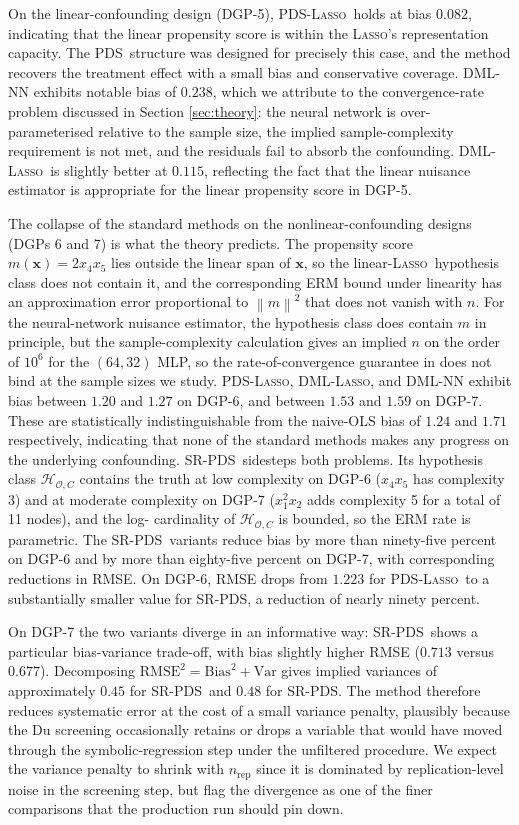 \documentclass[11pt, a4paper]{article}
\theoremstyle{plain}
\theoremstyle{definition}
\theoremstyle{remark}
\newcommand{\lasso}{\textsc{Lasso}}
\newcommand{\pds}{\textsc{PDS}}
\newcommand{\dml}{\textsc{DML}}
\newcommand{\epds}{\textsc{SR-PDS}}
\newcommand{\norm}[1]{\left\lVert #1 \right\rVert}
\newcommand{\Hcal}{\mathcal{H}_{\mathcal{O}, C}}
\begin{document}
On the linear-confounding design (DGP-5), \pds-\lasso\ holds at
bias $0.082$, indicating that the linear propensity score is
within the \lasso's representation capacity. The \pds\ structure
was designed for precisely this case, and the method recovers
the treatment effect with a small bias and conservative coverage.
\dml-NN exhibits notable bias of $0.238$, which we attribute to
the convergence-rate problem discussed in Section
\ref{sec:theory}: the neural network is over-parameterised
relative to the sample size, the implied sample-complexity
requirement is not met, and the residuals fail to absorb the
confounding. \dml-\lasso\ is slightly better at $0.115$,
reflecting the fact that the linear nuisance estimator is
appropriate for the linear propensity score in DGP-5.

The collapse of the standard methods on the nonlinear-confounding
designs (DGPs 6 and 7) is what the theory predicts. The
propensity score $m(\bm{x}) = 2 x_4 x_5$ lies outside the linear
span of $\bm{x}$, so the linear-\lasso\ hypothesis class does
not contain it, and the corresponding ERM bound under linearity
has an approximation error proportional to $\norm{m}^2$ that does
not vanish with $n$. For the neural-network nuisance estimator,
the hypothesis class does contain $m$ in principle, but the
sample-complexity calculation gives an implied $n$ on the order
of $10^6$ for the $(64, 32)$ MLP, so the rate-of-convergence
guarantee in \citet{chernozhukov2018} does not bind at the
sample sizes we study. \pds-\lasso, \dml-\lasso, and \dml-NN
exhibit bias between $1.20$ and $1.27$ on DGP-6, and between
$1.53$ and $1.59$ on DGP-7. These are statistically
indistinguishable from the naive-OLS bias of $1.24$ and $1.71$
respectively, indicating that none of the standard methods makes
any progress on the underlying confounding. \epds\ sidesteps both problems. Its hypothesis class $\Hcal$
contains the truth at low complexity on DGP-6 ($x_4 x_5$ has
complexity 3) and at moderate complexity on DGP-7 ($x_1^2 x_2$
adds complexity 5 for a total of 11 nodes), and the log-%
cardinality of $\Hcal$ is bounded, so the ERM rate is parametric. The \epds\ variants
reduce bias by more than ninety-five percent on DGP-6 and by
more than eighty-five percent on DGP-7, with corresponding
reductions in RMSE. On DGP-6, RMSE drops from $1.223$ for
\pds-\lasso\ to a substantially smaller value for \epds, a reduction of nearly
ninety percent.

On DGP-7 the two variants diverge in an informative way:
\epds\ shows a particular bias-variance trade-off, with bias slightly
higher RMSE ($0.713$ versus $0.677$). Decomposing
$\text{RMSE}^2 = \text{Bias}^2 + \text{Var}$ gives implied
variances of approximately $0.45$ for \epds\ and $0.48$ for
\epds. The method therefore reduces systematic error at the
cost of a small variance penalty, plausibly because the Du
screening occasionally retains or drops a variable that would
have moved through the symbolic-regression step under the
unfiltered procedure. We expect the variance penalty to shrink
with $n_{\text{rep}}$ since it is dominated by replication-level
noise in the screening step, but flag the divergence as one of
the finer comparisons that the production run should pin down.
\end{document}
